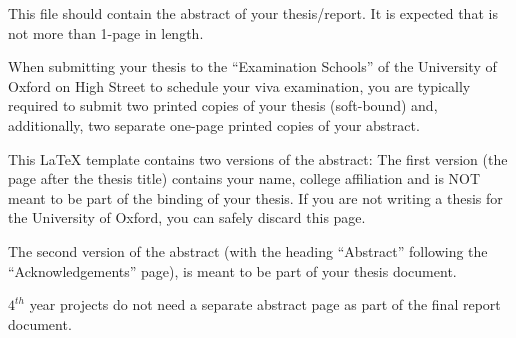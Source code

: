 
\noindent {} 

This file should contain the abstract of your thesis/report. It is expected that is
not more than 1-page in length.


When submitting your thesis to the ``Examination Schools'' of the University
of Oxford on High Street to schedule your viva examination, you are typically required
to submit two printed copies of your thesis (soft-bound) and, additionally, two
separate one-page printed copies of your abstract. 

This LaTeX template contains two versions of the abstract: The first version
(the page after the thesis title) contains your name, college affiliation and
is NOT meant to be part of the binding of your thesis. If you are not writing
a thesis for the University of Oxford, you can safely discard this page. 

The second version of the abstract (with the heading ``Abstract'' following
the ``Acknowledgements'' page), is meant to be part of your thesis document.

$4^{th}$ year projects do not need a separate abstract page as part of the final
report document.

\noindent {} 

\lipsum[1-4]

